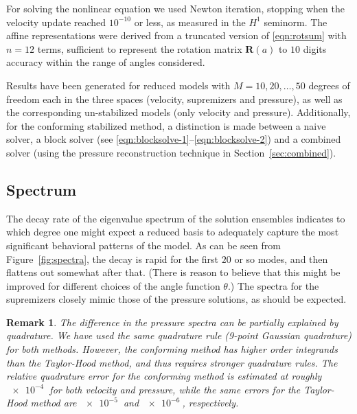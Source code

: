\documentclass[onecolumn, twoside, a4paper, 11pt]{article}
\newtheorem{remark}{Remark}
\begin{document}
For solving the nonlinear equation we used Newton iteration, stopping when the
velocity update reached $10^{-10}$ or less, as measured in the $H^1$ seminorm.
The affine representations were derived from a truncated version of
\eqref{eqn:rotsum} with $n=12$ terms, sufficient to represent the rotation
matrix $\bm R(a)$ to $10$ digits accuracy within the range of angles considered.

Results have been generated for reduced models with $M=10,20,\ldots,50$ degrees
of freedom each in the three spaces (velocity, supremizers and pressure), as
well as the corresponding un-stabilized models (only velocity and pressure).
Additionally, for the conforming stabilized method, a distinction is made
between a naive solver, a block solver
(see \eqref{eqn:blocksolve-1}--\eqref{eqn:blocksolve-2})
and a combined solver
(using the pressure reconstruction technique in Section~\ref{sec:combined}).

\subsection{Spectrum}

The decay rate of the eigenvalue spectrum of the solution ensembles indicates to which degree one
might expect a reduced basis to adequately capture the most significant behavioral patterns of the
model. As can be seen from Figure~\ref{fig:spectra}, the decay is rapid for the first $20$ or so
modes, and then flattens out somewhat after that. (There is reason to believe that this might be
improved for different choices of the angle function $\theta$.) The spectra for the supremizers
closely mimic those of the pressure solutions, as should be expected.

\begin{remark}
  The difference in the pressure spectra can be partially explained by quadrature. We have used the
  same quadrature rule (9-point Gaussian quadrature) for both methods. However, the conforming
  method has higher order integrands than the Taylor-Hood method, and thus requires stronger
  quadrature rules. The relative quadrature error for the conforming method is estimated at roughly
  $\SI{e-4}{}$ for both velocity and pressure, while the same errors for the Taylor-Hood method are
  $\SI{e-5}{}$ and $\SI{e-6}{}$, respectively.
\end{remark}
\end{document}
